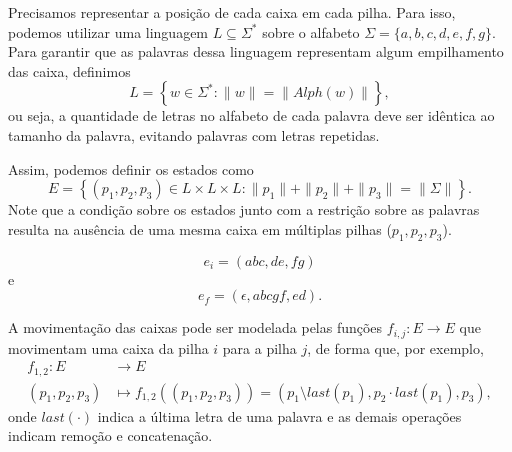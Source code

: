 \documentclass[a4paper]{report}
\begin{document}


Precisamos representar a posição de cada caixa em cada pilha. Para isso, podemos utilizar uma linguagem $L\subseteq \Sigma^*$ sobre o alfabeto $\Sigma=\{a,b,c,d,e,f,g\} $. Para garantir que as palavras dessa linguagem representam algum empilhamento das caixa, definimos \[
L = \left\{ w\in \Sigma^* : \|w\| = \|Alph\left( w \right) \|\right\} 
,\] ou seja, a quantidade de letras no alfabeto de cada palavra deve ser idêntica ao tamanho da palavra, evitando palavras com letras repetidas.

Assim, podemos definir os estados como \[
E = \left\{ \left( p_1,p_2,p_3 \right) \in L\times L\times L : \|p_1\|+\|p_2\|+\|p_3\| = \|\Sigma\| \right\} 
.\] Note que a condição sobre os estados junto com a restrição sobre as palavras resulta na ausência de uma mesma caixa em múltiplas pilhas ($p_1,p_2,p_3$).


\[
e_i = \left( abc, de, fg \right) 
\] e \[
e_f = \left( \epsilon, abcgf, ed \right) 
.\] 


A movimentação das caixas pode ser modelada pelas funções $f_{i,j}: E \longrightarrow E$ que movimentam uma caixa da pilha $i$ para a pilha $j$, de forma que, por exemplo,
\begin{align*}
    f_{1,2}: E &\longrightarrow E \\
    \left( p_1,p_2,p_3 \right)  &\longmapsto f_{1,2}(\left( p_1,p_2,p_3 \right) ) = \left( p_1 \setminus last\left( p_1 \right), p_2\cdot last\left( p_1 \right)  , p_3 \right) 
,\end{align*}
onde $last(\cdot )$ indica a última letra de uma palavra e as demais operações indicam remoção e concatenação.
\end{document}
